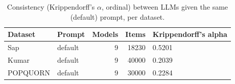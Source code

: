 \begin{table}[t]
\centering
\caption{Consistency (Krippendorff's $\alpha$, ordinal) between LLMs given the same (default) prompt, per dataset.}
\label{tab:llm-consistency-cross-model}
\begin{tabular}{llrrl}
\toprule
Dataset & Prompt & Models & Items & Krippendorff's alpha \\
\midrule
Sap & default & 9 & 18230 & 0.5201 \\
Kumar & default & 9 & 40000 & 0.2039 \\
POPQUORN & default & 9 & 30000 & 0.2284 \\
\bottomrule
\end{tabular}
\end{table}

